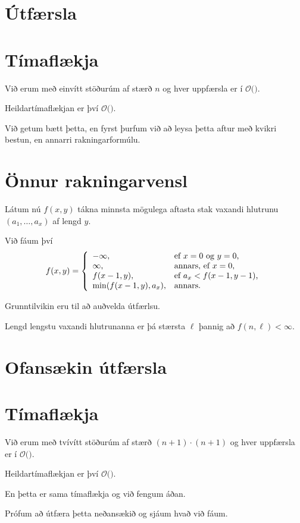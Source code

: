 \section{Útfærsla}
{
}

\section{Tímaflækja}
{
    {
        \item<1-> Við erum með einvítt stöðurúm af stærð $n$ og hver uppfærsla er í $\mathcal{O}($$)$.
        \item<3-> Heildartímaflækjan er því $\mathcal{O}($$)$.
        \item<5-> Við getum bætt þetta, en fyrst þurfum við að leysa þetta aftur með kvikri bestun, en annarri rakningarformúlu.
    }
}

\section{Önnur rakningarvensl}
{
    {
        \item<1-> Látum nú $f(x, y)$ tákna minnsta mögulega aftasta stak vaxandi hlutrunu $(a_1, \dots, a_x)$ af lengd $y$.
        \item<2-> Við fáum því
        \[
            f(x, y) = \left \{
            \env{array}
            { {l l}
                -\infty, & \text{ef $x = 0$ og $y = 0$,} \\
                \infty, & \text{annars, ef $x = 0$,} \\
                f(x - 1, y), & \text{ef $a_x < f(x - 1, y - 1)$,} \\
                \min(f(x - 1, y), a_x), & \text{annars.}
            }
            \right .
        \]
        \item<3-> Grunntilvikin eru til að auðvelda útfærlsu.
        \item<4-> Lengd lengstu vaxandi hlutrunanna er þá stærsta $\ell$ þannig að $f(n, \ell) < \infty$.
    }
}

\section{Ofansækin útfærsla}
{
}

\section{Tímaflækja}
{
    {
        \item<1-> Við erum með tvívítt stöðurúm af stærð $(n + 1) \cdot (n + 1)$ og hver uppfærsla er í $\mathcal{O}($$)$.
        \item<3-> Heildartímaflækjan er því $\mathcal{O}($$)$.
        \item<5-> En þetta er sama tímaflækja og við fengum áðan.
        \item<6-> Prófum að útfæra þetta neðansækið og sjáum hvað við fáum.
    }
}

